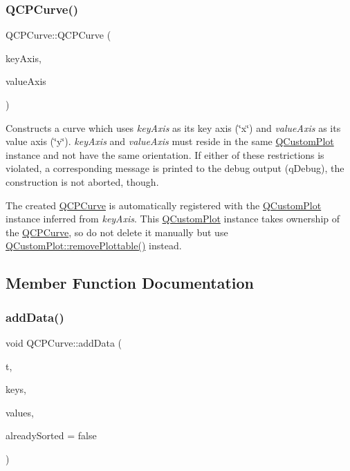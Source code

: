 \subsubsection{\texorpdfstring{Q\+C\+P\+Curve()}{QCPCurve()}}
{\footnotesize\ttfamily Q\+C\+P\+Curve\+::\+Q\+C\+P\+Curve (\begin{DoxyParamCaption}\item[{\mbox{\hyperlink{class_q_c_p_axis}{Q\+C\+P\+Axis}} $\ast$}]{key\+Axis,  }\item[{\mbox{\hyperlink{class_q_c_p_axis}{Q\+C\+P\+Axis}} $\ast$}]{value\+Axis }\end{DoxyParamCaption})\hspace{0.3cm}{\ttfamily [explicit]}}

Constructs a curve which uses {\itshape key\+Axis} as its key axis (\char`\"{}x\char`\"{}) and {\itshape value\+Axis} as its value axis (\char`\"{}y\char`\"{}). {\itshape key\+Axis} and {\itshape value\+Axis} must reside in the same \mbox{\hyperlink{class_q_custom_plot}{Q\+Custom\+Plot}} instance and not have the same orientation. If either of these restrictions is violated, a corresponding message is printed to the debug output (q\+Debug), the construction is not aborted, though.

The created \mbox{\hyperlink{class_q_c_p_curve}{Q\+C\+P\+Curve}} is automatically registered with the \mbox{\hyperlink{class_q_custom_plot}{Q\+Custom\+Plot}} instance inferred from {\itshape key\+Axis}. This \mbox{\hyperlink{class_q_custom_plot}{Q\+Custom\+Plot}} instance takes ownership of the \mbox{\hyperlink{class_q_c_p_curve}{Q\+C\+P\+Curve}}, so do not delete it manually but use \mbox{\hyperlink{class_q_custom_plot_af3dafd56884208474f311d6226513ab2}{Q\+Custom\+Plot\+::remove\+Plottable()}} instead. 

\subsection{Member Function Documentation}
\mbox{\label{class_q_c_p_curve_a73edf394b94f3f24f07518e30565a07f}} 
\subsubsection{\texorpdfstring{add\+Data()}{addData()}\hspace{0.1cm}{\footnotesize\ttfamily [1/4]}}
{\footnotesize\ttfamily void Q\+C\+P\+Curve\+::add\+Data (\begin{DoxyParamCaption}\item[{const Q\+Vector$<$ double $>$ \&}]{t,  }\item[{const Q\+Vector$<$ double $>$ \&}]{keys,  }\item[{const Q\+Vector$<$ double $>$ \&}]{values,  }\item[{bool}]{already\+Sorted = {\ttfamily false} }\end{DoxyParamCaption})}

